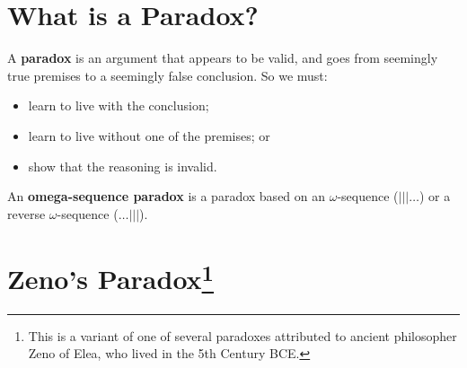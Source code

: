 \documentclass[12pt]{extarticle}
\begin{document}



\section{What is a Paradox?}

A \textbf{paradox} is an argument that appears to be valid, and goes from seemingly true premises to a seemingly false conclusion. So we must:


\begin{itemize}
\item learn to live with the conclusion;

\item learn to live without one of the premises; or

\item show that the reasoning is invalid.

\end{itemize}
An \textbf{omega-sequence paradox} is a paradox based on an $\omega$-sequence ($| | | \dots$) or a reverse $\omega$-sequence ($\dots | | | $).

\section{Zeno's Paradox\footnote{This is a variant of one of several paradoxes attributed to ancient philosopher Zeno of Elea, who lived in the 5th Century BCE.
} {\normalsize {}}}
\end{document}
